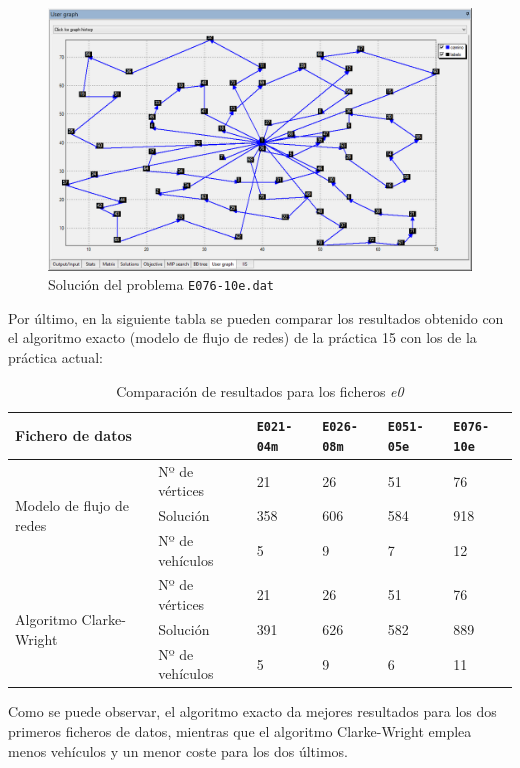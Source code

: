 \documentclass[a4paper,11pt]{article}
\begin{document}
\begin{figure}[!htbp]
	\centering
	\includegraphics[width=1.0\textwidth]{e076_clarke_wright.png}
    \caption{Solución del problema \texttt{E076-10e.dat}}
\end{figure}

\clearpage
Por último, en la siguiente tabla se pueden comparar los resultados obtenido con el algoritmo exacto (modelo de flujo de redes) de la práctica 15 con los de la práctica actual:

\begin{table}[!htbp]
\label{results_e0}
\centering
\begin{tabularx}{\textwidth}{|X|X|X|X|X|X|}
\hline
\multicolumn{2}{|l|}{Fichero de datos}	& \texttt{E021-04m}	& \texttt{E026-08m}	& \texttt{E051-05e}	& \texttt{E076-10e}	\\ \hline
\multirow{3}{2cm}{Modelo de flujo de redes}	& Nº de vértices	& 21	& 26	& 51	& 76	\\ \cline{2-6}
											& Solución	& 358	& 606	& 584	& 918	\\ \cline{2-6}
											& Nº de vehículos	& 5	& 9	& 7	& 12	\\ \hline
\multirow{3}{2cm}{Algoritmo Clarke-Wright}	& Nº de vértices	& 21	& 26	& 51	& 76	\\ \cline{2-6}
											& Solución	& 391	& 626	& 582	& 889	\\ \cline{2-6}
											& Nº de vehículos	& 5	& 9	& 6	& 11	\\ \hline
\end{tabularx}
\caption{Comparación de resultados para los ficheros \textit{e0}}
\end{table}

Como se puede observar, el algoritmo exacto da mejores resultados para los dos primeros ficheros de datos, mientras que el algoritmo Clarke-Wright emplea menos vehículos y un menor coste para los dos últimos.
\end{document}
